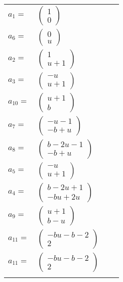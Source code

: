 \documentclass[1p]{elsarticle_modified}
\theoremstyle{definition}
\begin{document}
\begin{tabular}{m{7pt} m{180pt} m{7pt} m{180pt} }
\flushright $a_{1}=$&$\begin{pmatrix}1\\0\end{pmatrix}$ \\
\flushright $a_{6}=$&$\begin{pmatrix}0\\u\end{pmatrix}$ \\
\flushright $a_{2}=$&$\begin{pmatrix}1\\u+1\end{pmatrix}$ \\
\flushright $a_{3}=$&$\begin{pmatrix}- u\\u+1\end{pmatrix}$ \\
\flushright $a_{10}=$&$\begin{pmatrix}u+1\\b\end{pmatrix}$ \\
\flushright $a_{7}=$&$\begin{pmatrix}- u-1\\- b+u\end{pmatrix}$ \\
\flushright $a_{8}=$&$\begin{pmatrix}b-2 u-1\\- b+u\end{pmatrix}$ \\
\flushright $a_{5}=$&$\begin{pmatrix}- u\\u+1\end{pmatrix}$ \\
\flushright $a_{4}=$&$\begin{pmatrix}b-2 u+1\\- b u+2 u\end{pmatrix}$ \\
\flushright $a_{9}=$&$\begin{pmatrix}u+1\\b- u\end{pmatrix}$ \\
\flushright $a_{11}=$&$\begin{pmatrix}- b u- b-2\\2\end{pmatrix}$\\ \flushright $a_{11}=$&$\begin{pmatrix}- b u- b-2\\2\end{pmatrix}$\\&\end{tabular}
\end{document}
